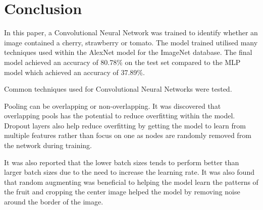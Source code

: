\documentclass[../main.tex]{subfiles}
\begin{document}
\section{Conclusion}

In this paper, a Convolutional Neural Network was trained to identify whether an image contained a cherry, strawberry or tomato. The model trained utilised many techniques used within the AlexNet model for the ImageNet database. The final model achieved an accuracy of 80.78\% on the test set compared to the MLP model which achieved an accuracy of 37.89\%.

Common techniques used for Convolutional Neural Networks were tested. 

Pooling can be overlapping or non-overlapping. It was discovered that overlapping pools has the potential to reduce overfitting within the model. Dropout layers also help reduce overfitting by getting the model to learn from multiple features rather than focus on one as nodes are randomly removed from the network during training. 

It was also reported that the lower batch sizes tends to perform better than larger batch sizes due to the need to increase the learning rate. It was also found that random augmenting was beneficial to helping the model learn the patterns of the fruit and cropping the center image  helped the model by removing noise around the border of the image. 
\end{document}
